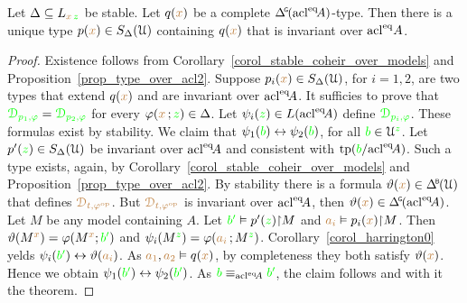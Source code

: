 \begin{theorem}[ (Stationarity)]\label{thm_stationarity}
  Let $\Delta\subseteq L_{{\color{brown} x}\,{\color{green} z}}$ be stable.
  Let $q({\color{brown} x})$ be a complete $\GDelta(\acl^\eq\!A)$-type.
  Then there is a unique type $p({\color{brown} x})\in S_\Delta(\EuScript U)$ containing $q({\color{brown} x})$ that is invariant over ${\rm acl}^{{\rm eq}} A$.
\end{theorem}

\begin{proof}
  Existence follows from Corollary~\ref{corol_stable_coheir_over_models} and Proposition~\ref{prop_type_over_acl2}.
  Suppose $p_i({\color{brown} x})\in S_\Delta(\EuScript U)$, for $i=1,2$, are two types that extend $q({\color{brown} x})$ and are invariant over ${\rm acl}^{{\rm eq}}\!A$.
  It sufficies to prove that ${\color{green}\EuScript D_{p_1,\varphi}}={\color{green}\EuScript D_{p_2,\varphi}}$ for every $\varphi({\color{brown} x}\,;{\color{green} z})\in\Delta$.
  Let $\psi_i({\color{green} z})\in L({\rm acl}^{{\rm eq}}\!A)$ define ${\color{green}\EuScript D_{p_i,\varphi}}$.
  These formulas exist by stability.
  We claim that $\psi_1({\color{green} b})\leftrightarrow\psi_2({\color{green} b})$, for all ${\color{green} b}\in\EuScript U^{\color{green} z}$.
  Let $p'({\color{green} z})\in S_\Delta(\EuScript U)$ be invariant over ${\rm acl}^{{\rm eq}}\!A$ and consistent with ${\rm tp}({\color{green} b}/{\rm acl}^{{\rm eq}}\!A)$.
  Such a type exists, again, by Corollary~\ref{corol_stable_coheir_over_models} and Proposition~\ref{prop_type_over_acl2}.
  By stability there is a formula $\theta({\mr x})\in\BDelta(\U)$ that defines ${\color{brown}\EuScript D_{t,\varphi^{\rm op}}}$.
  But ${\color{brown}\EuScript D_{t,\varphi^{\rm op}}}$ is invariant over ${\rm acl}^{{\rm eq}}\!A$, then $\theta({\mr x})\in\GDelta(\acl^\eq\!A)$.
  Let $M$ be any model containing $A$.
  Let ${\color{green} b'}\vDash p'({\color{green} z}){\restriction}M$ and ${\color{brown} a_i}\vDash p_i({\color{brown} x}){\restriction}M$.
  Then $\vartheta(M^{\color{brown} x})=\varphi(M^{\color{brown} x};{\color{green} b'})$ and $\psi_i(M^{\color{green} z})=\varphi({\color{brown} a_i}\,;M^{\color{green} z})$.
  Corollary~\ref{corol_harrington0} yelds $\psi_i({\color{green} b'})\leftrightarrow\vartheta({\color{brown} a_i})$.
  As ${\color{brown} a_1},{\color{brown} a_2}\vDash q({\color{brown} x})$, by completeness they both satisfy $\vartheta({\color{brown} x})$. 
  Hence we obtain $\psi_1({\color{green} b'})\leftrightarrow\psi_2({\color{green} b'})$.
  As ${\color{green} b}\equiv_{{\rm acl}^{{\rm eq}}\!A}{\color{green} b'}$, the claim follows and with it the theorem.
\end{proof}


